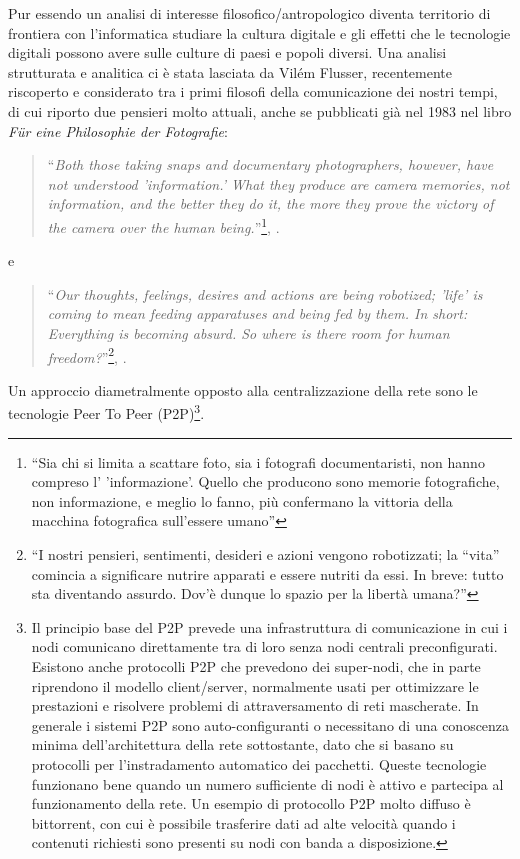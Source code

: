 Pur essendo un analisi di interesse filosofico/antropologico diventa
territorio di frontiera con l'informatica studiare la cultura digitale
e gli effetti che le tecnologie digitali possono avere sulle culture
di paesi e popoli diversi. Una analisi strutturata e analitica ci è
stata lasciata da Vilém Flusser, recentemente riscoperto e considerato
tra i primi filosofi della comunicazione dei nostri tempi, di cui
riporto due pensieri molto attuali, anche se pubblicati già nel 1983
nel libro \emph{F{\"u}r eine Philosophie der Fotografie}:

\begin{quote}
  ``\emph{Both those taking snaps and documentary photographers, however,
  have not understood 'information.' What they produce are camera
  memories, not information, and the better they do it, the more they
  prove the victory of the camera over the human
  being.}''\footnote{``Sia chi si limita a scattare foto, sia i fotografi
documentaristi, non hanno compreso l' 'informazione'. Quello che
producono sono memorie fotografiche, non informazione, e meglio lo
fanno, più confermano la vittoria della macchina fotografica
sull'essere umano''}, \citet{flusser1983philosophie}.
\end{quote}

e 

\begin{quote}
  ``\emph{Our thoughts, feelings, desires and actions are being
    robotized; 'life' is coming to mean feeding apparatuses and being
    fed by them. In short: Everything is becoming absurd. So where is
    there room for human freedom?}''\footnote{``I nostri pensieri,
    sentimenti, desideri e azioni vengono robotizzati; la ``vita''
    comincia a significare nutrire apparati e essere nutriti da
    essi. In breve: tutto sta diventando assurdo. Dov'è dunque lo
    spazio per la libertà umana?''}, \citet{flusser1983philosophie}.
\end{quote}

Un approccio diametralmente opposto alla centralizzazione della rete
sono le tecnologie Peer To Peer (P2P)\footnote{Il principio base del
  P2P prevede una infrastruttura di comunicazione in cui i nodi
  comunicano direttamente tra di loro senza nodi centrali
  preconfigurati. Esistono anche protocolli P2P che prevedono dei
  super-nodi, che in parte riprendono il modello client/server,
  normalmente usati per ottimizzare le prestazioni e risolvere
  problemi di attraversamento di reti mascherate. In generale i
  sistemi P2P sono auto-configuranti o necessitano di una conoscenza
  minima dell'architettura della rete sottostante, dato che si basano
  su protocolli per l'instradamento automatico dei pacchetti. Queste
  tecnologie funzionano bene quando un numero sufficiente di nodi è
  attivo e partecipa al funzionamento della rete. Un esempio di
  protocollo P2P molto diffuso è bittorrent, con cui è possibile
  trasferire dati ad alte velocità quando i contenuti richiesti sono
  presenti su nodi con banda a disposizione.}.

